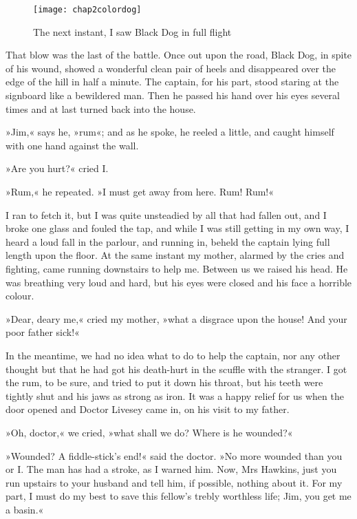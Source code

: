  \begin{figure}[p]
\centering
\texttt{[image: chap2colordog]}
\caption[\textbf{The next instant, I saw Black Dog in full flight}]{The next instant, I saw Black Dog in full flight}
\end{figure}

That blow was the last of the battle. Once out upon the road, Black Dog, in spite of his wound, showed a wonderful clean pair of heels and disappeared over the edge of the hill in half a minute. The captain, for his part, stood staring at the signboard like a bewildered man. Then he passed his hand over his eyes several times and at last turned back into the house.

»Jim,« says he, »rum«; and as he spoke, he reeled a little, and caught himself with one hand against the wall.

»Are you hurt?« cried I.

»Rum,« he repeated. »I must get away from here. Rum! Rum!«

I ran to fetch it, but I was quite unsteadied by all that had fallen out, and I broke one glass and fouled the tap, and while I was still getting in my own way, I heard a loud fall in the parlour, and running in, beheld the captain lying full length upon the floor. At the same instant my mother, alarmed by the cries and fighting, came running downstairs to help me. Between us we raised his head. He was breathing very loud and hard, but his eyes were closed and his face a horrible colour.

»Dear, deary me,« cried my mother, »what a disgrace upon the house! And your poor father sick!«

In the meantime, we had no idea what to do to help the captain, nor any other thought but that he had got his death-hurt in the scuffle with the stranger. I got the rum, to be sure, and tried to put it down his throat, but his teeth were tightly shut and his jaws as strong as iron. It was a happy relief for us when the door opened and Doctor Livesey came in, on his visit to my father.

»Oh, doctor,« we cried, »what shall we do? Where is he wounded?«

»Wounded? A fiddle-stick's end!« said the doctor. »No more wounded than you or I. The man has had a stroke, as I warned him. Now, Mrs Hawkins, just you run upstairs to your husband and tell him, if possible, nothing about it. For my part, I must do my best to save this fellow's trebly worthless life; Jim, you get me a basin.«

